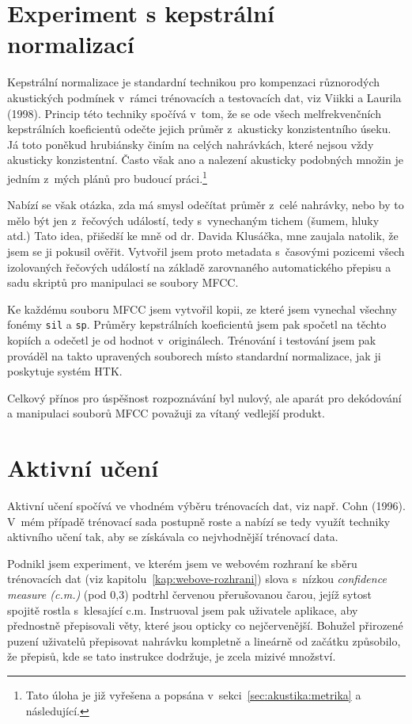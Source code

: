 \section{Experiment s kepstrální normalizací}
\label{sec:mfcc-norm}

Kepstrální normalizace je standardní technikou pro kompenzaci různorodých
akustických podmínek v~rámci trénovacích a testovacích dat, viz Viikki a Laurila
(1998)\cite{viikki1998cepstral}. Princip této techniky spočívá v~tom, že se ode
všech melfrekvenčních kepstrálních koeficientů odečte jejich průměr z~akusticky
konzistentního úseku. Já toto poněkud hrubiánsky činím na celých nahrávkách,
které nejsou vždy akusticky konzistentní. Často však ano a nalezení akusticky
podobných množin je jedním z~mých plánů pro budoucí práci.\footnote{Tato úloha
je již vyřešena a popsána v~sekci~\ref{sec:akustika:metrika} a následující.}

Nabízí se však otázka, zda má smysl odečítat průměr z~celé nahrávky, nebo by to
mělo být jen z~řečových událostí, tedy s~vynechaným tichem (šumem, hluky atd.)
Tato idea, přišedší ke mně od dr. Davida Klusáčka, mne zaujala natolik, že jsem se
ji pokusil ověřit. Vytvořil jsem proto metadata s~časovými pozicemi všech
izolovaných řečových událostí na základě zarovnaného automatického přepisu a sadu skriptů
pro manipulaci se soubory MFCC.

Ke každému souboru MFCC jsem vytvořil kopii, ze které
jsem vynechal všechny fonémy \texttt{sil} a \texttt{sp}. Průměry kepstrálních
koeficientů jsem pak spočetl na těchto kopiích a odečetl je od hodnot
v~originálech. Trénování i testování jsem pak prováděl na takto upravených
souborech místo standardní normalizace, jak ji poskytuje systém HTK.

Celkový přínos pro úspěšnost rozpoznávání byl nulový, ale aparát pro dekódování
a manipulaci souborů MFCC považuji za vítaný vedlejší produkt.

\section{Aktivní učení}

Aktivní učení spočívá ve vhodném výběru trénovacích dat, viz např. Cohn
(1996)\cite{cohn1996active}. V~mém případě trénovací sada postupně roste a nabízí
se tedy využít techniky aktivního učení tak, aby se získávala co nejvhodnější
trénovací data.

Podnikl jsem experiment, ve kterém jsem ve webovém rozhraní ke sběru trénovacích
dat (viz kapitolu~\ref{kap:webove-rozhrani}) slova s~nízkou {\em confidence
measure (c.m.)} (pod 0,3) podtrhl červenou přerušovanou čarou, jejíž sytost spojitě rostla
s~klesající c.m. Instruoval jsem pak uživatele aplikace, aby přednostně
přepisovali věty, které jsou opticky co nejčervenější. Bohužel přirozené puzení
uživatelů přepisovat nahrávku kompletně a lineárně od začátku způsobilo, že
přepisů, kde se tato instrukce dodržuje, je zcela mizivé množství.

